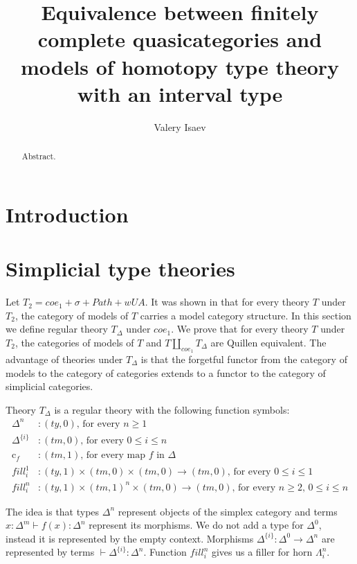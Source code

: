 \documentclass[reqno]{amsart}
\theoremstyle{definition}
\theoremstyle{remark}
\newcommand{\vtx}[2]{\Delta^{\{#2\}}}
\newcommand{\cmap}[1]{\mathrm{c}_{#1}}
\numberwithin{figure}{section}
\begin{document}
\title[Equivalence between quasicategories and models of type theory]{Equivalence between finitely complete quasicategories and models of homotopy type theory with an interval type}

\author{Valery Isaev}

\begin{abstract}
Abstract.
\end{abstract}

\maketitle

\section{Introduction}

\section{Simplicial type theories}

Let $T_2 = coe_1 + \sigma + Path + wUA$.
It was shown in \cite{alg-models} that for every theory $T$ under $T_2$, the category of models of $T$ carries a model category structure.
In this section we define regular theory $T_\Delta$ under $coe_1$.
We prove that for every theory $T$ under $T_2$, the categories of models of $T$ and $T \amalg_{coe_1} T_\Delta$ are Quillen equivalent.
The advantage of theories under $T_\Delta$ is that the forgetful functor from the category of models
to the category of categories extends to a functor to the category of simplicial categories.

Theory $T_\Delta$ is a regular theory with the following function symbols:
\begin{align*}
\Delta^n & : (ty,0) \text{, for every } n \geq 1 \\
\vtx{n}{i} & : (tm,0) \text{, for every } 0 \leq i \leq n \\
\cmap{f} & : (tm,1) \text{, for every map $f$ in $\Delta$} \\
fill^1_i & : (ty,1) \times (tm,0) \times (tm,0) \to (tm,0) \text{, for every } 0 \leq i \leq 1 \\
fill^n_i & : (ty,1) \times (tm,1)^n \times (tm,0) \to (tm,0) \text{, for every } n \geq 2 \text{, } 0 \leq i \leq n
\end{align*}

The idea is that types $\Delta^n$ represent objects of the simplex category and terms $x : \Delta^m \vdash f(x) : \Delta^n$ represent its morphisms.
We do not add a type for $\Delta^0$, instead it is represented by the empty context.
Morphisms $\Delta^{\{i\}} : \Delta^0 \to \Delta^n$ are represented by terms $\vdash \vtx{n}{i} : \Delta^n$.
Function $fill^n_i$ gives us a filler for horn $\Lambda^n_i$.
\end{document}
